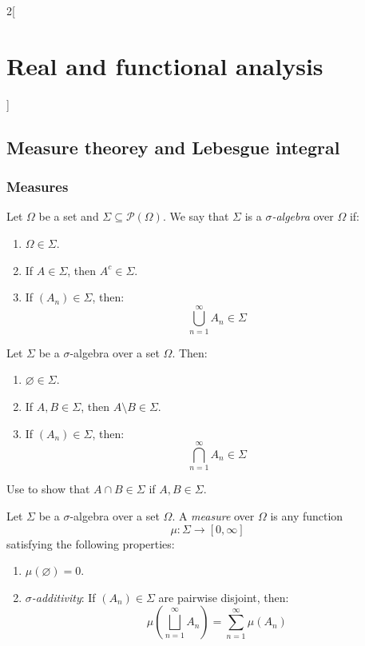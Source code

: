\documentclass[../../../main_math.tex]{subfiles}
\begin{document}
\begin{multicols}{2}[\section{Real and functional analysis}]
  \subsection{Measure theorey and Lebesgue integral}
  \subsubsection{Measures}
  \begin{definition}
    Let $\Omega$ be a set and $\Sigma\subseteq\mathcal{P}(\Omega)$. We say that $\Sigma$ is a \emph{$\sigma$-algebra} over $\Omega$ if:
    \begin{enumerate}
      \item $\Omega\in\Sigma$.
      \item If $A\in\Sigma$, then $A^c\in\Sigma$.
      \item If $(A_n)\in\Sigma$, then: $$\bigcup_{n=1}^\infty A_n\in\Sigma$$
    \end{enumerate}
  \end{definition}
  \begin{proposition}
    Let $\Sigma$ be a $\sigma$-algebra over a set $\Omega$. Then:
    \begin{enumerate}
      \item $\varnothing\in\Sigma$.
      \item If $A,B\in\Sigma$, then $A\setminus B\in\Sigma$.
      \item If $(A_n)\in\Sigma$, then: $$\bigcap_{n=1}^\infty A_n\in\Sigma$$
    \end{enumerate}
  \end{proposition}
  \begin{sproof}
    Use  to show that $A\cap B\in \Sigma$ if $A,B\in\Sigma$.
  \end{sproof}
  \begin{definition}[Measure]
    Let $\Sigma$ be a $\sigma$-algebra over a set $\Omega$. A \emph{measure} over $\Omega$ is any function $$\mu:\Sigma\longrightarrow[0,\infty]$$ satisfying the following properties:
    \begin{enumerate}[ref = $\sigma$-additivity]
      \item $\mu(\varnothing)=0$.
            \item\label{RFA:sigmaadditivity} \emph{$\sigma$-additivity}: If $(A_n)\in\Sigma$ are pairwise disjoint, then: $$\mu\left(\bigsqcup_{n=1}^\infty A_n\right)=\sum_{n=1}^\infty \mu(A_n)$$

\end{enumerate}
\end{definition}
\end{multicols}
\end{document}
